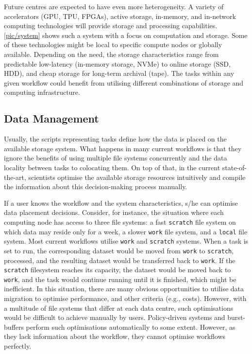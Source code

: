 \documentclass{superfri}
\begin{document}
Future centres are expected to have even more heterogeneity. A variety of accelerators (GPU, TPU, FPGAs), active storage, in-memory, and in-network computing technologies will provide storage and processing capabilities.
\cref{pic/system} shows such a system with a focus on computation and storage.
Some of these technologies might be local to specific compute nodes or globally available.
Depending on the need, the storage characteristics range from predictable low-latency (in-memory storage, NVMe) to online storage (SSD, HDD), and cheap storage for long-term archival (tape).
The tasks within any given workflow could benefit from utilising different combinations of storage and computing infrastructure.


\subsection{Data Management}
\label{sec:datamanagement}

Usually, the scripts representing tasks define how the data is placed on the available storage system.
What happens in many current workflows is that they ignore the benefits of using multiple file systems concurrently and the data locality between tasks to colocating them.
On top of that, in the current state-of-the-art, scientists optimise the available storage resources intuitively and compile the information about this decision-making process manually.

If a user knows the workflow and the system characteristics, s/he can optimise data placement decisions.
Consider, for instance, the situation where each computing node has access to three file systems: a fast \texttt{scratch} file system on which data may reside only for a week, a slower \texttt{work} file system, and a \texttt{local} file system.
Most current workflows utilise \texttt{work} and \texttt{scratch} systems.
When a task is set to run, the corresponding dataset would be moved from \texttt{work} to \texttt{scratch}, processed, and the resulting dataset would be transferred back to \texttt{work}.
If the \texttt{scratch} filesystem reaches its capacity, the dataset would be moved back to \texttt{work}, and the task would continue running until it is finished, which might be inefficient. %
In this situation, there are many obvious opportunities to utilise data migration to optimise performance, and other criteria (e.g., costs).
However, with a multitude of file systems that differ at each data centre, such optimisations would be difficult to achieve manually by users.
Policy-driven systems and burst-buffers perform such optimisations automatically to some extent. However, as they lack information about the workflow, they cannot optimise workflows perfectly.
\end{document}
